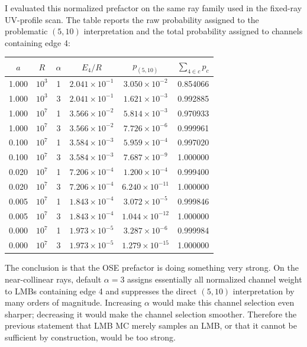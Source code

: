 \documentclass[11pt]{article}
\begin{document}
I evaluated this normalized prefactor on the same ray family used in the
fixed-ray UV-profile scan.  The table reports the raw probability assigned to
the problematic $(5,10)$ interpretation and the total probability assigned to
channels containing edge 4:
\begin{center}
\small
\begin{tabular}{cccccc}
\toprule
$a$ & $R$ & $\alpha$ & $E_4/R$ & $p_{(5,10)}$ & $\sum_{4\in c}p_c$\\
\midrule
1.000 & $10^3$ & 1 & $2.041\times10^{-1}$ & $3.050\times10^{-2}$ & 0.854066\\
1.000 & $10^3$ & 3 & $2.041\times10^{-1}$ & $1.621\times10^{-3}$ & 0.992885\\
1.000 & $10^7$ & 1 & $3.566\times10^{-2}$ & $5.814\times10^{-3}$ & 0.970933\\
1.000 & $10^7$ & 3 & $3.566\times10^{-2}$ & $7.726\times10^{-6}$ & 0.999961\\
0.100 & $10^7$ & 1 & $3.584\times10^{-3}$ & $5.959\times10^{-4}$ & 0.997020\\
0.100 & $10^7$ & 3 & $3.584\times10^{-3}$ & $7.687\times10^{-9}$ & 1.000000\\
0.020 & $10^7$ & 1 & $7.206\times10^{-4}$ & $1.200\times10^{-4}$ & 0.999400\\
0.020 & $10^7$ & 3 & $7.206\times10^{-4}$ & $6.240\times10^{-11}$ & 1.000000\\
0.005 & $10^7$ & 1 & $1.843\times10^{-4}$ & $3.072\times10^{-5}$ & 0.999846\\
0.005 & $10^7$ & 3 & $1.843\times10^{-4}$ & $1.044\times10^{-12}$ & 1.000000\\
0.000 & $10^7$ & 1 & $1.973\times10^{-5}$ & $3.287\times10^{-6}$ & 0.999984\\
0.000 & $10^7$ & 3 & $1.973\times10^{-5}$ & $1.279\times10^{-15}$ & 1.000000\\
\bottomrule
\end{tabular}
\end{center}
The conclusion is that the OSE prefactor is doing something very strong.  On
the near-collinear rays, default $\alpha=3$ assigns essentially all normalized
channel weight to LMBs containing edge 4 and suppresses the direct $(5,10)$
interpretation by many orders of magnitude.  Increasing $\alpha$ would make
this channel selection even sharper; decreasing it would make the channel
selection smoother.  Therefore the previous statement that LMB MC merely
samples an LMB, or that it cannot be sufficient by construction, would be too
strong.
\end{document}
